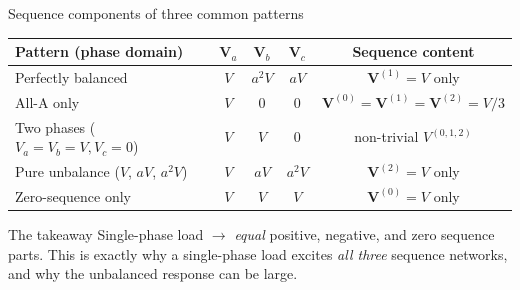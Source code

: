 \documentclass[aspectratio=169,10pt]{beamer}
\begin{document}
\begin{frame}{Sequence components of three common patterns}
\centering
\small
\begin{tabular}{lcccc}
\toprule
Pattern (phase domain) & $\mathbf{V}_a$ & $\mathbf{V}_b$ & $\mathbf{V}_c$ & Sequence content \\
\midrule
Perfectly balanced & $V$ & $a^2 V$ & $a V$ & $\mathbf{V}^{(1)} = V$ only \\
All-A only & $V$ & 0 & 0 & $\mathbf{V}^{(0)}\!=\!\mathbf{V}^{(1)}\!=\!\mathbf{V}^{(2)}\!=\!V/3$ \\
Two phases ($V_a\!=\!V_b\!=\!V, V_c\!=\!0$) & $V$ & $V$ & 0 & non-trivial $V^{(0,1,2)}$ \\
Pure unbalance ($V$, $a V$, $a^2 V$) & $V$ & $a V$ & $a^2 V$ & $\mathbf{V}^{(2)} = V$ only \\
Zero-sequence only & $V$ & $V$ & $V$ & $\mathbf{V}^{(0)} = V$ only \\
\bottomrule
\end{tabular}
\vspace{0.6em}
\begin{block}{The takeaway}
Single-phase load $\rightarrow$ \emph{equal} positive, negative, and zero sequence parts. This is exactly why a single-phase load excites \emph{all three} sequence networks, and why the unbalanced response can be large.
\end{block}
\end{frame}
\end{document}
